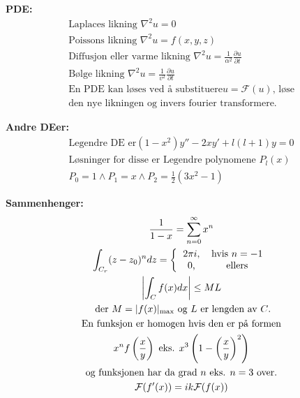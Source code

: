 \documentclass[8pt, A4paper, norsk]{extarticle}
\begin{document}
\begin{multicols*}{3}
\textbf{PDE:}
		\begin{gather*}
\text{Laplaces likning } \nabla^2 u = 0 \\
\text{Poissons likning } \nabla^2 u = f(x, y, z) \\
\text{Diffusjon eller varme likning } \nabla^2 u = \frac{1}{\alpha^2} \frac{\partial u}{\partial t} \\
\text{Bølge likning } \nabla^2 u = \frac{1}{v^2} \frac{\partial u}{\partial t} \\
\text{En PDE kan løses ved å substituere} u = \mathcal{F}(u) \text{, løse} \\
\text{den nye likningen og invers fourier transformere.}
		\end{gather*}


\textbf{Andre DEer:}
		\begin{gather*}
\text{Legendre DE er} (1 - x^2)y'' - 2xy' + l(l + 1)y = 0 \\
\text{Løsninger for disse er Legendre polynomene $P_l(x)$} \\
P_0 = 1 \wedge P_1 = x \wedge P_2 = \frac{1}{2}(3x^2 - 1)
		\end{gather*}

\textbf{Sammenhenger:}
		\begin{gather*}
\frac{1}{1 - x} = \sum_{n = 0}^{\infty} x^n \\
\int_{C_r} (z - z_0)^{n} dz = \left\{ 
\begin{tabular}{ cc }
$2 \pi i$,& hvis $n = - 1$ \\
$0$,& ellers
\end{tabular} 
\right. \\
\left| \int_{C} f(x) dx \right| \leq ML \\
\text{ der $M = |f(x)|_{\text{max}}$ og $L$ er lengden av $C$.} \\
\text{En funksjon er homogen hvis den er på formen} \\
x^{n}f\left( \frac{x}{y} \right) \text{ eks. } x^{3} \left( 1 - \left( \frac{x}{y} \right)^2 \right) \\
\text{og funksjonen har da grad $n$ eks. $n = 3$ over.} \\
\mathcal{F}(f'(x)) = ik \mathcal{F}(f(x))
		\end{gather*}
	\end{multicols*}
\end{document}
